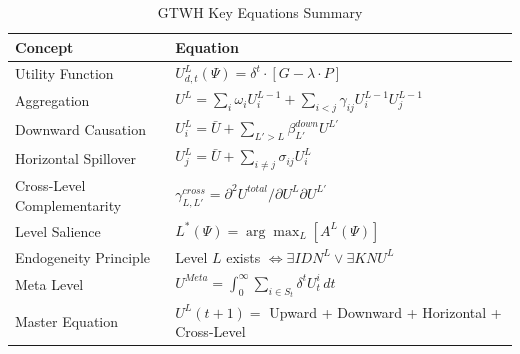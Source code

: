 \documentclass[12pt,a4paper]{article}
\begin{document}
\begin{table}[htbp]
\centering
\caption{GTWH Key Equations Summary}
\label{tab:equations-summary}
\renewcommand{\arraystretch}{1.5}
\small
\begin{tabular}{@{}p{4cm}p{8cm}@{}}
\toprule
\textbf{Concept} & \textbf{Equation} \\
\midrule
Utility Function & $U^L_{d,t}(\Psi) = \delta^t \cdot [G - \lambda \cdot P]$ \\
Aggregation & $U^L = \sum_i \omega_i U^{L-1}_i + \sum_{i<j} \gamma_{ij} U^{L-1}_i U^{L-1}_j$ \\
Downward Causation & $U^L_i = \bar{U} + \sum_{L'>L} \beta^{down}_{L'} U^{L'}$ \\
Horizontal Spillover & $U^L_j = \bar{U} + \sum_{i \neq j} \sigma_{ij} U^L_i$ \\
Cross-Level Complementarity & $\gamma^{cross}_{L,L'} = \partial^2 U^{total} / \partial U^L \partial U^{L'}$ \\
Level Salience & $L^*(\Psi) = \arg\max_L [A^L(\Psi)]$ \\
Endogeneity Principle & Level $L$ exists $\iff \exists IDN^L \lor \exists KNU^L$ \\
Meta Level & $U^{Meta} = \int_0^\infty \sum_{i \in S_t} \delta^t U^i_t \, dt$ \\
Master Equation & $U^L(t+1) = $ Upward + Downward + Horizontal + Cross-Level \\
\bottomrule
\end{tabular}
\end{table}

\end{document}
